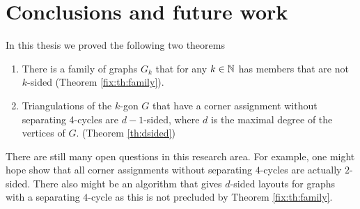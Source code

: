 
\section{ Conclusions and future work }

In this thesis we proved the following two theorems

\begin{enumerate}
  \item There is a family of graphs $G_k$ that for any $k \in \mathbb{N}$ has members that are not $k$-sided (Theorem \ref{fix:th:family}).
  \item Triangulations of the $k$-gon $G$ that have a corner assignment without separating 4-cycles are $d-1$-sided, where $d$ is the maximal degree of the vertices of $G$. (Theorem \ref{th:dsided})
\end{enumerate}

There are still many open questions in this research area. For example, one might hope show that all corner assignments without separating $4$-cycles are actually $2$-sided.
There also might be an algorithm that gives $d$-sided layouts for graphs with a separating $4$-cycle as this is not precluded by Theorem \ref{fix:th:family}.


